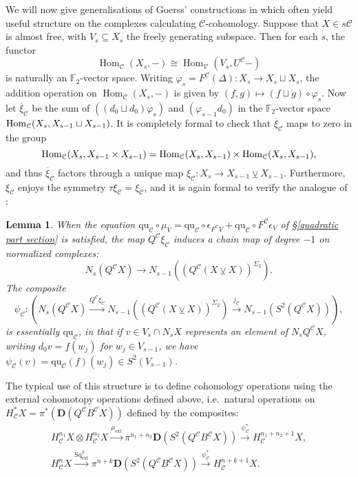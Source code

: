 \documentclass[11pt]{amsart} \renewcommand{\baselinestretch}{1.2}
\theoremstyle{plain}
\newtheorem{lem}[thm]{Lemma}
\numberwithin{equation}{section} %
\theoremstyle{plain}
\newtheorem{lem}[thm]{Lemma}
\numberwithin{equation}{chapter} %
\DeclareMathOperator{\Hom}{Hom}
\newcommand{\DASH}{\mathrm{-}}
\let\phi\varphi
\renewcommand{\to}{\longrightarrow}
\newcommand{\calV}{\mathcal{V}}
\newcommand{\calc}{\mathcal{C}}
\newcommand{\citeBOX}[2][]{\cite[\mbox{#1}]{#2}}
\newcommand{\vect}[2]{\calV^{#1}_{#2}}
\newcommand{\quadratic}{\mathrm{qu}}
\newcommand{\ExtCohOp}{\mathrm{Sq}_\mathrm{ext}}
\newcommand{\ExtCohProd}{\mu_\mathrm{ext}}
\newcommand{\F}{\mathbb{F}}
\newcommand{\Ftwo}{\F_2}
\newcommand{\dual}{\mathbf{D}}
\newcommand{\smashcoprod}{\veebar}%
\renewcommand{\mapsto}{\longmapsto}
\begin{document}
\begin{Constructing cohomology operations}
We will now give generalisations of Goerss' constructions in \citeBOX[\S5]{MR1089001} which often yield useful structure on the complexes calculating $\calc$-cohomology.  Suppose that $X\in s\calc$ is almost free, with $V_s\subseteq X_s$ the freely generating subspace. Then for each $s$, the functor 
\[\Hom_\calc(X_s,\DASH)\cong \Hom_{\vect{}{}}(V_s,U^\calc\DASH)\]
is naturally an $\Ftwo $-vector space. Writing $\phi_s=F^\calc(\Delta):X_s\to X_s\sqcup X_s$, the addition operation on $\Hom_\calc(X_s,\DASH)$ is given by $(f,g)\mapsto (f\sqcup g)\circ\phi_s$. Now let
$\overline{\xi}_\calc$ be the sum of $((d_0\sqcup d_0)\phi_s)$ and $(\phi_{s-1}d_0)$ in the $\Ftwo $-vector space $\textup{Hom}_\calc(X_s,X_{s-1}\sqcup X_{s-1})$. It is completely formal to check that $\overline{\xi}_\calc$ maps to zero in the group
\[\textup{Hom}_\calc(X_s,X_{s-1}\times X_{s-1})=\textup{Hom}_\calc(X_s,X_{s-1})\times \textup{Hom}_\calc(X_s,X_{s-1}),\]
and thus $\overline{\xi}_\calc$ factors through a unique map $\xi_\calc:X_s\to X_{s-1}\smashcoprod X_{s-1}$. Furthermore, $\xi_\calc$ enjoys the symmetry $\tau\xi_\calc=\xi_\calc$, and it is again formal to verify the analogue of \cite[Lemma 5.5]{MR1089001}:
\begin{lem}
\label{psi is basically the quadratic part}
When the equation $\quadratic_\calc\circ\mu_V=\quadratic_\calc\circ \epsilon_{F^\calc V} +\quadratic_\calc\circ {F^\calc \epsilon_V}$ of \S\ref{quadratic part section} is satisfied, the map $Q^\calc\xi_\calc$ induces a chain map of degree $-1$ on normalized complexes:
\[N_s(Q^{\calc}X)\to N_{s-1}((Q^{\calc}(X\smashcoprod X))^{\Sigma_2}).\]
The composite
\[\psi_\calc:\left(N_s(Q^{\calc}X)\overset{Q^\calc\xi_\calc}{\to} N_{s-1}((Q^{\calc}(X\smashcoprod X))^{\Sigma_2})\overset{j_\calc}{\to} N_{s-1}(S^2(Q^{\calc}X))\right),\]
is essentially $\quadratic_\calc$, in that if $v\in V_s\cap N_sX$ represents an element of $N_sQ^\calc X$, writing $d_0v=f(w_j)$ for $w_j\in V_{s-1}$, we have $\psi_\calc(v)=\quadratic_\calc(f)(w_j)\in S^2(V_{s-1})$.
\end{lem}
The typical use of this structure is to define cohomology operations using the external cohomotopy operations defined above, i.e.\ natural operations on $H^*_\calc X=\pi^*(\dual(Q^\calc B^\calc X))$ defined by the composites:
\begin{gather*}
H_\calc^{n_1}X\otimes H_\calc^{n_2}X\overset{\ExtCohProd}{\to} \pi^{n_1+n_2}\dual(S^2(Q^\calc B^\calc X))\overset{\psi_\calc^*}{\to} H_\calc^{n_1+n_2+1}X,\\
H_\calc^{n}X\overset{\ExtCohOp^k}{\to} \pi^{n+k}\dual(S^2(Q^\calc B^\calc X))\overset{\psi_\calc^*}{\to} H_\calc^{n+k+1}X.

\end{gather*}
\end{Constructing cohomology operations}
\end{document}
